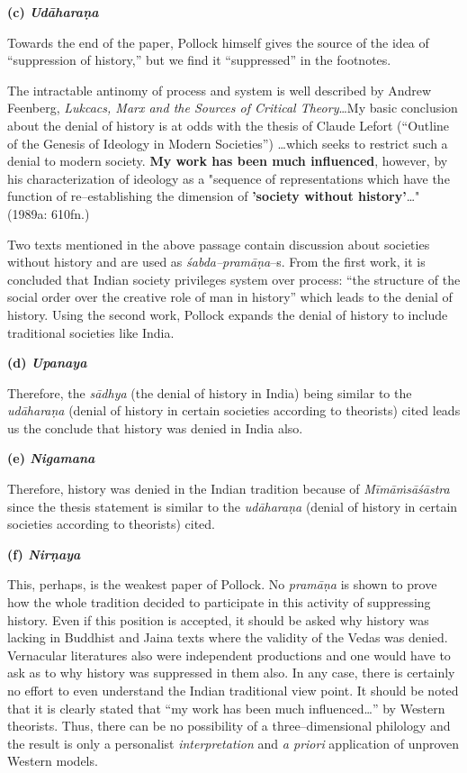 \textbf{(c) \textit{Udāharaṇa}}

Towards the end of the paper, Pollock himself gives the source of the idea of “suppression of history,” but we find it “suppressed” in the footnotes.

\begin{myquote}
The intractable antinomy of process and system is well described by Andrew Feenberg, \textit{Lukcacs, Marx and the Sources of Critical Theory}…My basic conclusion about the denial of history is at odds with the thesis of Claude Lefort (“Outline of the Genesis of Ideology in Modern Societies”) …which seeks to restrict such a denial to modern society. \textbf{My work has been much influenced}, however, by his characterization of ideology as a "sequence of representations which have the function of re–establishing the dimension of \textbf{'society without history'}…" (1989a: 610fn.)
\end{myquote}

Two texts mentioned in the above passage contain discussion about societies without history and are used as \textit{śabda–pramāṇa}–s. From the first work, it is concluded that Indian society privileges system over process: “the structure of the social order over the creative role of man in history” which leads to the denial of history. Using the second work, Pollock expands the denial of history to include traditional societies like India.

\textbf{(d) \textit{Upanaya}}

Therefore, the \textit{sādhya} (the denial of history in India) being similar to the \textit{udāharaṇa} (denial of history in certain societies according to theorists) cited leads us the conclude that history was denied in India also.

\textbf{(e) \textit{Nigamana}}

Therefore, history was denied in the Indian tradition because of \textit{Mīmāṁsāśāstra} since the thesis statement is similar to the \textit{udāharaṇa} (denial of history in certain societies according to theorists) cited.

\textbf{(f) \textit{Nirṇaya}}

This, perhaps, is the weakest paper of Pollock. No \textit{pramāṇa} is shown to prove how the whole tradition decided to participate in this activity of suppressing history. Even if this position is accepted, it should be asked why history was lacking in Buddhist and Jaina texts where the validity of the Vedas was denied. Vernacular literatures also were independent productions and one would have to ask as to why history was suppressed in them also. In any case, there is certainly no effort to even understand the Indian traditional view point. It should be noted that it is clearly stated that “my work has been much influenced…” by Western theorists. Thus, there can be no possibility of a three–dimensional philology and the result is only a personalist \textit{interpretation} and \textit{a priori} application of unproven Western models.

